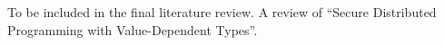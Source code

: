 To be included in the final literature review. A review of ``Secure Distributed
Programming with Value-Dependent Types''. \cite{fstar_distributed_programming}
